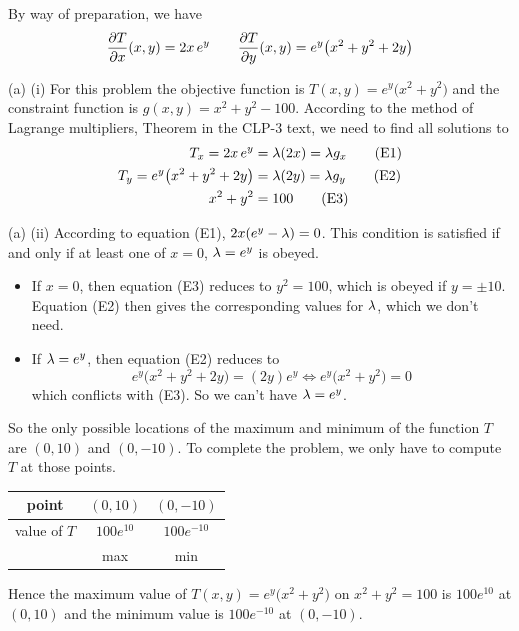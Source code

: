 \begin{solution}
By way of preparation, we have
\begin{align*}
\pdiff{T}{x}(x,y) =  2x\,e^y\qquad
\pdiff{T}{y}(x,y) =  e^y\big(x^2+y^2+2y\big)
\end{align*}

(a) (i) 
For this problem the objective function is $T(x,y) = e^y\big(x^2+y^2\big)$
and the constraint function is $g(x,y)=x^2 + y^2 - 100$. 
According to the method of Lagrange multipliers, Theorem 
in the CLP-3 text, we need to find all solutions to
\begin{align*}
T_x = 2x\,e^y &=\lambda (2x) = \lambda g_x \tag{E1}\\
T_y = e^y\big(x^2+y^2+2y\big) &=\lambda (2y) = \lambda g_y \tag{E2}\\
x^2+y^2&=100 \tag{E3}
\end{align*}

(a) (ii)
According to equation (E1), $2x(e^y-\lambda)=0$. This condition is satisfied
if and only if at least one of $x=0$, $\lambda=e^y$ is obeyed.
\begin{itemize}
\item 
If $x=0$, then equation (E3) reduces to $y^2=100$, which is obeyed if $y=\pm 10$.
Equation (E2) then gives the corresponding values for $\lambda$, which we don't need.

\item
If $\lambda=e^y$, then equation (E2) reduces to
\begin{equation*}
e^y\big(x^2+y^2+2y\big) = (2y)e^y
\iff 
e^y\big(x^2+y^2\big)=0
\end{equation*}
which conflicts with (E3). So we can't have $\lambda=e^y$.
\end{itemize}
So the only possible locations of the maximum and minimum of the function
$T$ are $(0,10)$ and $(0,-10)$. To complete the problem, we only have to 
compute $T$ at those points.
\begin{center}
\renewcommand{\arraystretch}{1.3}
     \begin{tabular}{|c|c|c|}
     \hline
       point
       &$(0,10)$
       &$(0,-10)$ \\ \hline
       value of $T$
       &$100 e^{10}$
       &$100 e^{-10}$ \\ \hline
       &max 
       &min  \\ \hline
     \end{tabular}
\renewcommand{\arraystretch}{1.0}
\end{center}
Hence the maximum value of $T(x,y) = e^y\big(x^2+y^2\big)$ on $x^2 + y^2 = 100$ 
is $100 e^{10}$ at $(0,10)$ and the minimum value is $100 e^{-10}$ at $(0,-10)$.


\end{solution}
